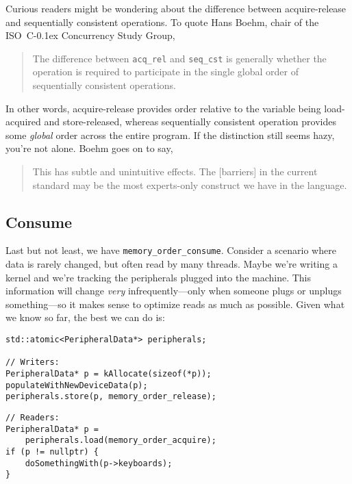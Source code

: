 \documentclass[fontsize=\bodyfontsize, numbers=endperiod]{scrartcl}
\newcommand{\codesize}{\fontsize{\bodyfontsize}{\bodybaselineskip}}
\newcommand{\cpp}[1]{C\kern-0.1ex\raisebox{0.15ex}{\texttt{++}}{\addfontfeature{Numbers=LowercaseOff}#1}}
\newenvironment{colfigure}
  {\par\vspace{1\baselineskip minus 0.5\baselineskip}\noindent\minipage{\linewidth}}
  {\endminipage\vspace{1\baselineskip minus 0.7\baselineskip}}
\begin{document}
\begin{multicols}{2}
Curious readers might be wondering about the difference between
acquire-release and sequentially consistent operations.
To quote Hans Boehm, chair of the ISO~\cpp{} Concurrency Study Group,
\begin{quote}
\small
The difference between \texttt{acq\_rel} and \texttt{seq\_cst} is generally
whether the operation is required to participate in the
single global order of sequentially consistent operations.
\end{quote}
In other words, acquire-release provides order relative to the variable
being load-acquired and store-released, whereas sequentially consistent
operation provides some \emph{global} order across the entire program.
If the distinction still seems hazy, you're not alone.
Boehm goes on to say,
\begin{quote}
\small
This has subtle and unintuitive effects.
The [barriers] in the current standard may be the most
experts-only construct we have in the language.
\end{quote}

\subsection{Consume}

Last but not least, we have \texttt{memory\_order\_consume}.
Consider a scenario where data is rarely changed,
but often read by many threads.
Maybe we're writing a kernel
and we're tracking the peripherals plugged into the machine.
This information will change \emph{very} infrequently---only when someone
plugs or unplugs something---so it makes sense to optimize reads as much as
possible.
Given what we know so far, the best we can do is:
\begin{colfigure}
\begin{verbatim}
std::atomic<PeripheralData*> peripherals;

// Writers:
PeripheralData* p = kAllocate(sizeof(*p));
populateWithNewDeviceData(p);
peripherals.store(p, memory_order_release);
\end{verbatim}
\begin{verbatim}
// Readers:
PeripheralData* p =
    peripherals.load(memory_order_acquire);
if (p != nullptr) {
    doSomethingWith(p->keyboards);
}
\end{verbatim}
\end{colfigure}


\end{multicols}
\end{document}
